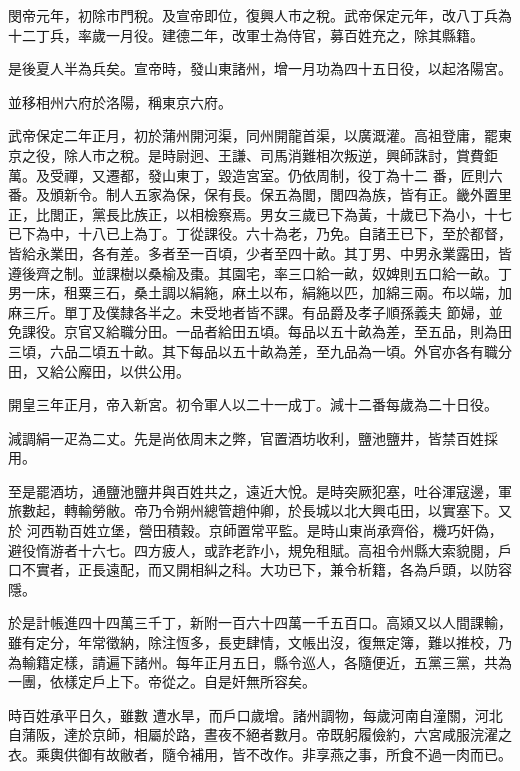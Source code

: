 \begin{pinyinscope}
 閔帝元年，初除市門稅。及宣帝即位，復興人市之稅。武帝保定元年，改八丁兵為十二丁兵，率歲一月役。建德二年，改軍士為侍官，募百姓充之，除其縣籍。



 是後夏人半為兵矣。宣帝時，發山東諸州，增一月功為四十五日役，以起洛陽宮。



 並移相州六府於洛陽，稱東京六府。



 武帝保定二年正月，初於蒲州開河渠，同州開龍首渠，以廣溉灌。高祖登庸，罷東京之役，除人市之稅。是時尉迥、王謙、司馬消難相次叛逆，興師誅討，賞費鉅萬。及受禪，又遷都，發山東丁，毀造宮室。仍依周制，役丁為十二
 番，匠則六番。及頒新令。制人五家為保，保有長。保五為閭，閭四為族，皆有正。畿外置里正，比閭正，黨長比族正，以相檢察焉。男女三歲已下為黃，十歲已下為小，十七已下為中，十八已上為丁。丁從課役。六十為老，乃免。自諸王已下，至於都督，皆給永業田，各有差。多者至一百頃，少者至四十畝。其丁男、中男永業露田，皆遵後齊之制。並課樹以桑榆及棗。其園宅，率三口給一畝，奴婢則五口給一畝。丁男一床，租粟三石，桑土調以絹絁，麻土以布，絹絁以匹，加綿三兩。布以端，加麻三斤。單丁及僕隸各半之。未受地者皆不課。有品爵及孝子順孫義夫
 節婦，並免課役。京官又給職分田。一品者給田五頃。每品以五十畝為差，至五品，則為田三頃，六品二頃五十畝。其下每品以五十畝為差，至九品為一頃。外官亦各有職分田，又給公廨田，以供公用。



 開皇三年正月，帝入新宮。初令軍人以二十一成丁。減十二番每歲為二十日役。



 減調絹一疋為二丈。先是尚依周末之弊，官置酒坊收利，鹽池鹽井，皆禁百姓採用。



 至是罷酒坊，通鹽池鹽井與百姓共之，遠近大悅。是時突厥犯塞，吐谷渾寇邊，軍旅數起，轉輸勞敝。帝乃令朔州總管趙仲卿，於長城以北大興屯田，以實塞下。又於
 河西勒百姓立堡，營田積穀。京師置常平監。是時山東尚承齊俗，機巧奸偽，避役惰游者十六七。四方疲人，或詐老詐小，規免租賦。高祖令州縣大索貌閱，戶口不實者，正長遠配，而又開相糾之科。大功已下，兼令析籍，各為戶頭，以防容隱。



 於是計帳進四十四萬三千丁，新附一百六十四萬一千五百口。高熲又以人間課輸，雖有定分，年常徵納，除注恆多，長吏肆情，文帳出沒，復無定簿，難以推校，乃為輸籍定樣，請遍下諸州。每年正月五日，縣令巡人，各隨便近，五黨三黨，共為一團，依樣定戶上下。帝從之。自是奸無所容矣。



 時百姓承平日久，雖數
 遭水旱，而戶口歲增。諸州調物，每歲河南自潼關，河北自蒲阪，達於京師，相屬於路，晝夜不絕者數月。帝既躬履儉約，六宮咸服浣濯之衣。乘輿供御有故敝者，隨令補用，皆不改作。非享燕之事，所食不過一肉而已。




\end{pinyinscope}
